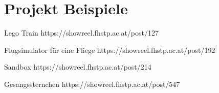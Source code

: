 \section{Projekt Beispiele}
 \frame{\sectionpage}

\begin{frame}{Lego Train}
https://showreel.fhstp.ac.at/post/127
\end{frame}


\begin{frame}{Flugsimulator für eine Fliege}
https://showreel.fhstp.ac.at/post/192
\end{frame}

\begin{frame}{Sandbox}
https://showreel.fhstp.ac.at/post/214
\end{frame}

\begin{frame}{Gesangssternchen}
https://showreel.fhstp.ac.at/post/547
\end{frame}


